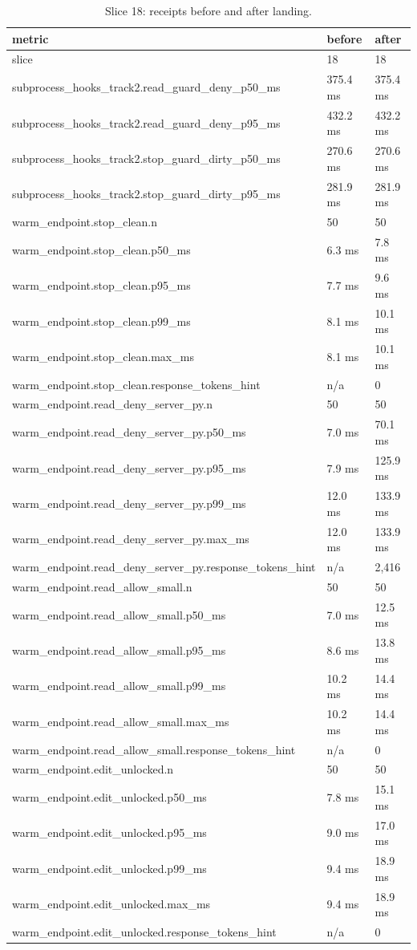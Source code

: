 \documentclass{article}
\begin{document}
\begin{table}[h]
\centering
\begin{tabular}{lll}
\toprule
metric & before & after \\
\midrule
slice & 18 & 18 \\
subprocess\_hooks\_track2.read\_guard\_deny\_p50\_ms & 375.4 ms & 375.4 ms \\
subprocess\_hooks\_track2.read\_guard\_deny\_p95\_ms & 432.2 ms & 432.2 ms \\
subprocess\_hooks\_track2.stop\_guard\_dirty\_p50\_ms & 270.6 ms & 270.6 ms \\
subprocess\_hooks\_track2.stop\_guard\_dirty\_p95\_ms & 281.9 ms & 281.9 ms \\
warm\_endpoint.stop\_clean.n & 50 & 50 \\
warm\_endpoint.stop\_clean.p50\_ms & 6.3 ms & 7.8 ms \\
warm\_endpoint.stop\_clean.p95\_ms & 7.7 ms & 9.6 ms \\
warm\_endpoint.stop\_clean.p99\_ms & 8.1 ms & 10.1 ms \\
warm\_endpoint.stop\_clean.max\_ms & 8.1 ms & 10.1 ms \\
warm\_endpoint.stop\_clean.response\_tokens\_hint & n/a & 0 \\
warm\_endpoint.read\_deny\_server\_py.n & 50 & 50 \\
warm\_endpoint.read\_deny\_server\_py.p50\_ms & 7.0 ms & 70.1 ms \\
warm\_endpoint.read\_deny\_server\_py.p95\_ms & 7.9 ms & 125.9 ms \\
warm\_endpoint.read\_deny\_server\_py.p99\_ms & 12.0 ms & 133.9 ms \\
warm\_endpoint.read\_deny\_server\_py.max\_ms & 12.0 ms & 133.9 ms \\
warm\_endpoint.read\_deny\_server\_py.response\_tokens\_hint & n/a & 2,416 \\
warm\_endpoint.read\_allow\_small.n & 50 & 50 \\
warm\_endpoint.read\_allow\_small.p50\_ms & 7.0 ms & 12.5 ms \\
warm\_endpoint.read\_allow\_small.p95\_ms & 8.6 ms & 13.8 ms \\
warm\_endpoint.read\_allow\_small.p99\_ms & 10.2 ms & 14.4 ms \\
warm\_endpoint.read\_allow\_small.max\_ms & 10.2 ms & 14.4 ms \\
warm\_endpoint.read\_allow\_small.response\_tokens\_hint & n/a & 0 \\
warm\_endpoint.edit\_unlocked.n & 50 & 50 \\
warm\_endpoint.edit\_unlocked.p50\_ms & 7.8 ms & 15.1 ms \\
warm\_endpoint.edit\_unlocked.p95\_ms & 9.0 ms & 17.0 ms \\
warm\_endpoint.edit\_unlocked.p99\_ms & 9.4 ms & 18.9 ms \\
warm\_endpoint.edit\_unlocked.max\_ms & 9.4 ms & 18.9 ms \\
warm\_endpoint.edit\_unlocked.response\_tokens\_hint & n/a & 0 \\
\bottomrule
\end{tabular}
\caption{Slice 18: receipts before and after landing.}
\label{tab:slice18}
\end{table}
\end{document}
